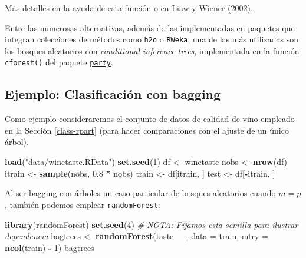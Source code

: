 \documentclass[]{book}
\newenvironment{Shaded}{\begin{snugshade}}{\end{snugshade}}
\newcommand{\KeywordTok}[1]{\textcolor[rgb]{0.13,0.29,0.53}{\textbf{#1}}}
\newcommand{\DataTypeTok}[1]{\textcolor[rgb]{0.13,0.29,0.53}{#1}}
\newcommand{\DecValTok}[1]{\textcolor[rgb]{0.00,0.00,0.81}{#1}}
\newcommand{\FloatTok}[1]{\textcolor[rgb]{0.00,0.00,0.81}{#1}}
\newcommand{\StringTok}[1]{\textcolor[rgb]{0.31,0.60,0.02}{#1}}
\newcommand{\CommentTok}[1]{\textcolor[rgb]{0.56,0.35,0.01}{\textit{#1}}}
\newcommand{\OperatorTok}[1]{\textcolor[rgb]{0.81,0.36,0.00}{\textbf{#1}}}
\newcommand{\NormalTok}[1]{#1}
\theoremstyle{break}
\theoremstyle{definition}
\theoremstyle{definition}
\theoremstyle{definition}
\theoremstyle{remark}
\begin{document}
Más detalles en la ayuda de esta función o en
\href{https://www.r-project.org/doc/Rnews/Rnews_2002-3.pdf}{Liaw y
Wiener (2002)}.

Entre las numerosas alternativas, además de las implementadas en
paquetes que integran colecciones de métodos como \texttt{h2o} o
\texttt{RWeka}, una de las más utilizadas son los bosques aleatorios con
\emph{conditional inference trees}, implementada en la función
\texttt{cforest()} del paquete
\href{https://CRAN.R-project.org/package=party}{\texttt{party}}.

\subsection{Ejemplo: Clasificación con
bagging}\label{ejemplo-clasificaciuxf3n-con-bagging}

Como ejemplo consideraremos el conjunto de datos de calidad de vino
empleado en la Sección \ref{class-rpart} (para hacer comparaciones con
el ajuste de un único árbol).

\begin{Shaded}
\begin{Highlighting}[]
\KeywordTok{load}\NormalTok{(}\StringTok{"data/winetaste.RData"}\NormalTok{)}
\KeywordTok{set.seed}\NormalTok{(}\DecValTok{1}\NormalTok{)}
\NormalTok{df <-}\StringTok{ }\NormalTok{winetaste}
\NormalTok{nobs <-}\StringTok{ }\KeywordTok{nrow}\NormalTok{(df)}
\NormalTok{itrain <-}\StringTok{ }\KeywordTok{sample}\NormalTok{(nobs, }\FloatTok{0.8} \OperatorTok{*}\StringTok{ }\NormalTok{nobs)}
\NormalTok{train <-}\StringTok{ }\NormalTok{df[itrain, ]}
\NormalTok{test <-}\StringTok{ }\NormalTok{df[}\OperatorTok{-}\NormalTok{itrain, ]}
\end{Highlighting}
\end{Shaded}

Al ser bagging con árboles un caso particular de bosques aleatorios
cuando \(m = p\), también podemos emplear \texttt{randomForest}:

\begin{Shaded}
\begin{Highlighting}[]
\KeywordTok{library}\NormalTok{(randomForest)}
\KeywordTok{set.seed}\NormalTok{(}\DecValTok{4}\NormalTok{) }\CommentTok{# NOTA: Fijamos esta semilla para ilustrar dependencia}
\NormalTok{bagtrees <-}\StringTok{ }\KeywordTok{randomForest}\NormalTok{(taste }\OperatorTok{~}\StringTok{ }\NormalTok{., }\DataTypeTok{data =}\NormalTok{ train, }\DataTypeTok{mtry =} \KeywordTok{ncol}\NormalTok{(train) }\OperatorTok{-}\StringTok{ }\DecValTok{1}\NormalTok{)}
\NormalTok{bagtrees}
\end{Highlighting}
\end{Shaded}
\end{document}
